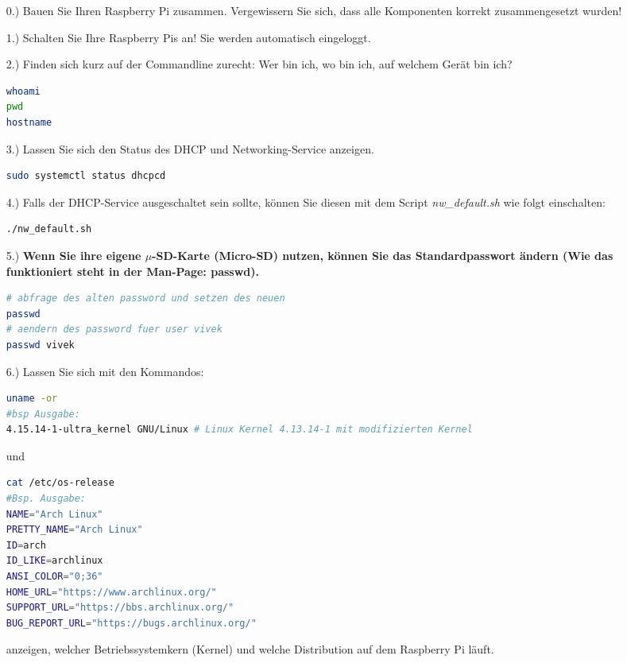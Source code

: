 \documentclass[paper=a4,fontsize=11pt]{scrartcl}%
\numberwithin{equation}{section}
\begin{document}
\begin{itemize}
	\item[0.)] Bauen Sie Ihren Raspberry Pi zusammen. Vergewissern Sie sich, dass alle Komponenten korrekt zusammengesetzt wurden!
	\item[1.)] Schalten Sie Ihre Raspberry Pis an! Sie werden automatisch eingeloggt.
	\item[2.)] Finden sich kurz auf der Commandline zurecht: \glqq Wer bin ich, wo bin ich, auf welchem Gerät bin ich?\grqq
		\begin{lstlisting}[style=Bash, language=Bash]
whoami
pwd
hostname
		\end{lstlisting}	
	\item[3.)] Lassen Sie sich den Status des DHCP und Networking-Service anzeigen.
	\begin{lstlisting}[style=Bash, language=Bash]
sudo systemctl status dhcpcd
		\end{lstlisting}
	\item[4.)] Falls der DHCP-Service ausgeschaltet sein sollte, können Sie diesen mit dem Script \emph{nw\_default.sh} wie folgt einschalten:
	\begin{lstlisting}[style=Bash, language=Bash]
./nw_default.sh
		\end{lstlisting}	
	\item[5.)] \textbf{Wenn Sie ihre eigene $\mu$-SD-Karte (Micro-SD) nutzen, können Sie das Standardpasswort ändern (Wie das funktioniert steht in der Man-Page: passwd).}
		\begin{lstlisting}[style=Bash, language=Bash]
# abfrage des alten password und setzen des neuen
passwd
# aendern des password fuer user vivek
passwd vivek
		\end{lstlisting}	
	\item[6.)] Lassen Sie sich mit den Kommandos:
			\begin{lstlisting}[style=Bash, language=Bash]
uname -or
#bsp Ausgabe:
4.15.14-1-ultra_kernel GNU/Linux # Linux Kernel 4.13.14-1 mit modifizierten Kernel
		\end{lstlisting} und
				\begin{lstlisting}[style=Bash, language=Bash]
cat /etc/os-release
#Bsp. Ausgabe:
NAME="Arch Linux"
PRETTY_NAME="Arch Linux"
ID=arch
ID_LIKE=archlinux
ANSI_COLOR="0;36"
HOME_URL="https://www.archlinux.org/"
SUPPORT_URL="https://bbs.archlinux.org/"
BUG_REPORT_URL="https://bugs.archlinux.org/"
\end{lstlisting} anzeigen, welcher Betriebssystemkern (Kernel) und welche Distribution auf dem Raspberry Pi läuft.

\end{itemize}
\end{document}

